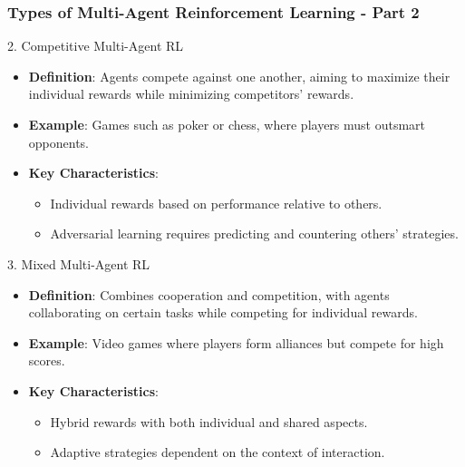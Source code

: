 \documentclass[aspectratio=169]{beamer}
\begin{document}
\begin{frame}[fragile]
    \frametitle{Types of Multi-Agent Reinforcement Learning - Part 2}
    \begin{block}{2. Competitive Multi-Agent RL}
        \begin{itemize}
            \item \textbf{Definition}: Agents compete against one another, aiming to maximize their individual rewards while minimizing competitors' rewards.
            \item \textbf{Example}: Games such as poker or chess, where players must outsmart opponents.
            \item \textbf{Key Characteristics}:
            \begin{itemize}
                \item Individual rewards based on performance relative to others.
                \item Adversarial learning requires predicting and countering others' strategies.
            \end{itemize}
        \end{itemize}
    \end{block}
    
    \begin{block}{3. Mixed Multi-Agent RL}
        \begin{itemize}
            \item \textbf{Definition}: Combines cooperation and competition, with agents collaborating on certain tasks while competing for individual rewards.
            \item \textbf{Example}: Video games where players form alliances but compete for high scores.
            \item \textbf{Key Characteristics}:
            \begin{itemize}
                \item Hybrid rewards with both individual and shared aspects.
                \item Adaptive strategies dependent on the context of interaction.
            \end{itemize}
        \end{itemize}
    \end{block}
\end{frame}
\end{document}
